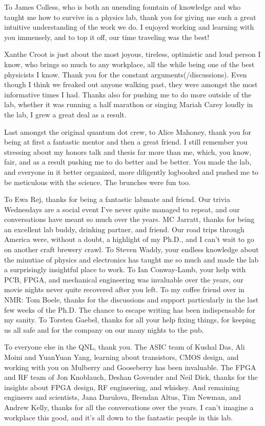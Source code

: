 To James Colless, who is both an unending fountain of knowledge and who taught me how to survive in a physics lab,
thank you for giving me such a great intuitive understanding of the work we do. I enjoyed working and learning with
you immensely, and to top it off, our time traveling was the best!

Xanthe Croot is just about the most joyous, tireless, optimistic and loud person I know, who brings so much to any
workplace, all the while being one of the best physicists I know. Thank you for the constant arguments(/discussions).
Even though I think we freaked out anyone walking past, they were amongst the most informative times I had.
Thanks also for pushing me to do more outside of the lab, whether it was running a half marathon or singing Mariah Carey
loudly in the lab, I grew a great deal as a result.

Last amongst the original quantum dot crew, to Alice Mahoney, thank you for being at first a fantastic mentor and then
a great friend. I still remember you stressing about my honors talk and thesis far more than me, which, you know, fair,
and as a result pushing me to do better and be better. You made the lab, and everyone in it better organized, more diligently
logbooked and pushed me to be meticulous with the science. The brunches were fun too.

To Ewa Rej, thanks for being a fantastic labmate and friend. Our trivia Wednesdays are a social event I've never quite managed
to repeat, and our conversations have meant so much over the years. MC Jarratt, thanks for being an excellent lab buddy, drinking
partner, and friend. Our road trips through America were, without a doubt, a highlight of my Ph.D., and I can't wait to go on another
craft brewery crawl. To Steven Waddy, your endless knowledge about the minutiae of physics and electronics has taught me so much and made the lab a surprisingly insightful place to work. To Ian Conway-Lamb, your help with PCB, FPGA, and mechanical engineering
was invaluable over the years, our movie nights never quite recovered after you left. To my coffee friend over in NMR: Tom Boele,
thanks for the discussions and support particularly in the last few weeks of the Ph.D. The chance to escape writing has been
indispensable for my sanity. To Torsten Gaebel, thanks for all your help fixing things, for keeping us all safe and for the
company on our many nights to the pub.

To everyone else in the QNL, thank you. The ASIC team of Kushal Das, Ali Moini and YuanYuan Yang, learning about transistors,
CMOS design, and working with you on Mulberry and Gooseberry has been invaluable. The FPGA and RF team of Jon Knoblauch, Deshan Govender
and Neil Dick, thanks for the insights about FPGA design, RF engineering, and whiskey. And remaining engineers and scientists,
Jana Darulova, Brendan Altus, Tim Newman, and Andrew Kelly, thanks for all the conversations over the years. I can't imagine a workplace
this good, and it's all down to the fantastic people in this lab.

